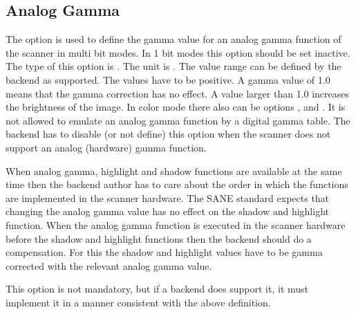 \documentclass[11pt,DVIps]{report}
\begin{document}
\begin{changebar}
\subsection{Analog Gamma}
The option  is used to define the gamma value 
for an analog gamma function of the scanner in multi bit modes.
In 1 bit modes this option should be set inactive.
The type of this option is .
The unit is . The value range
can be defined by the backend as supported. The values
have to be positive. A gamma value of 1.0 means that
the gamma correction has no effect. A value larger than
1.0 increases the brightness of the image.
In color mode there also can be options ,
 and .
It is not allowed to emulate an analog gamma function by
a digital gamma table. The backend has to disable (or not
define) this option when the scanner does not support an
analog (hardware) gamma function.

When analog gamma, highlight and shadow functions are available
at the same time then the backend author has to care about the order
in which the functions are implemented in the scanner hardware.
The SANE standard expects that changing the analog gamma value
has no effect on the shadow and highlight function. When the
analog gamma function is executed in the scanner hardware
before the shadow and highlight functions then the backend
should do a compensation. For this the shadow and highlight
values have to be gamma corrected with the relevant analog gamma value.

This option is not mandatory, but if a backend does support it, it
must implement it in a manner consistent with the above definition.\\
\end{changebar}
\end{document}
